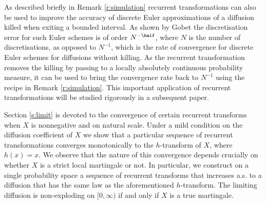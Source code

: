 \documentclass[11pt,reqno]{amsart}
\numberwithin{equation}{section}
\begin{document}
As described briefly in Remark \ref{r:simulation} recurrent transformations can also  be used to improve the accuracy of discrete Euler approximations of a diffusion killed when exiting a bounded interval. As shown by Gobet \cite{GobetKilled} the discretisation error for such Euler schemes is of order $N^{-\half}$, where $N$ is the number of discretisations, as opposed to $N^{-1}$, which is the rate of convergence for discrete Euler schemes for diffusions without killing. As the recurrent transformation removes the killing by passing to a locally absolutely continuous probability measure, it can be used to bring the convergence rate back to $N^{-1}$ using the recipe in Remark \ref{r:simulation}. This important application of recurrent transformations will be  studied rigorously in a subsequent paper.

Section \ref{s:limit} is devoted to the convergence of  certain recurrent transforms when $X$ is nonnegative and on natural scale. Under a mild condition on the diffusion coefficient of $X$ we show that a particular sequence of recurrent transformations converges monotonically to the $h$-transform of $X$, where $h(x)=x$. We observe that the nature of this convergence depends crucially on whether $X$ is a strict local martingale or not. In particular,  we construct on a single probability space a sequence of recurrent transforms that increases a.s. to a diffusion that has the same law as the aforementioned $h$-transform. The limiting diffusion is non-exploding on $[0,\infty)$ if and only if $X$ is a true martingale. 
\end{document}

